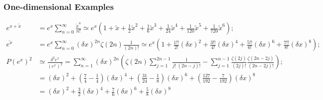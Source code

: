 \documentclass[twoside]{article}
\numberwithin{equation}{section}
\begin{document}
\subsubsection{One-dimensional Examples}

\iffalse

\begin{align*}
e^{x + \tilde{x}} &= e^x \sum_{n=0}^{\infty} \frac{\tilde{x}^n}{n!}
 \simeq e^x \left(1 + \tilde{x} + \frac{1}{2} \tilde{x}^2 + \frac{1}{6} \tilde{x}^3 + \frac{1}{24} \tilde{x}^4 + \frac{1}{120} \tilde{x}^5 + \frac{1}{720} \tilde{x}^6 \right); \\
\overline{e^x} &= e^x \sum_{n=0}^{\infty} (\delta x)^{2n} \zeta(2n) \frac{1}{(2n)!} 
 \simeq e^x \left(1 + \frac{1!!}{2!} (\delta x)^2 + \frac{3!!}{4!} (\delta x)^4 + \frac{5!!}{6!} (\delta x)^6 + \frac{7!!}{8!} (\delta x)^8 \right); \\
P(e^x)^2 &\simeq \frac{\delta^2 e^x}{(e^x)^2} =  \sum_{n=1}^{\infty} (\delta x)^{2n} \left( \zeta(2n) \sum_{j=1}^{2n-1} \frac{1}{j!\;(2n - j)!} 
   	- \sum_{j=1}^{n-1} \frac{\zeta(2j)}{(2j)!}  \frac{\zeta(2n - 2j)}{(2n - 2j)!} \right); \\
 &= (\delta x)^2 + (\frac{7}{4} - \frac{1}{4}) (\delta x)^4 + (\frac{31}{24} - \frac{1}{8}) (\delta x)^6
  + (\frac{127}{192} - \frac{7}{192}) (\delta x)^8 \\
 &= (\delta x)^2 + \frac{3}{2} (\delta x)^4 + \frac{7}{6} (\delta x)^6 + \frac{5}{8} (\delta x)^8
\end{align*}
\end{document}
